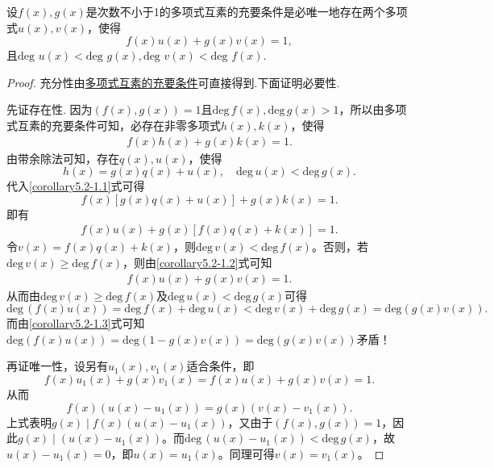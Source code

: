 \documentclass[lang=cn,newtx,10pt,scheme=chinese]{elegantbook}
\begin{document}
\begin{corollary}\label{corollary:次数不小于1的多项式互素的充要条件}
设\(f(x),g(x)\)是次数不小于1的多项式互素的充要条件是必唯一地存在两个多项式\(u(x),v(x)\)，使得
\[
f(x)u(x)+g(x)v(x)=1,
\]
且\(\text{deg }u(x)<\text{deg }g(x),\text{deg }v(x)<\text{deg }f(x)\).
\end{corollary}
\begin{proof}
充分性由\hyperref[theorem:多项式互素的充要条件]{多项式互素的充要条件}可直接得到.下面证明必要性.

先证存在性.
因为\(( f(x),g(x) ) = 1\)且\(\mathrm{deg}\,f(x),\mathrm{deg}\,g(x) > 1\)，所以由多项式互素的充要条件可知，必存在非零多项式\(h(x),k(x)\)，使得
\begin{align}
f(x)h(x)+g(x)k(x)=1. \label{corollary5.2-1.1} 
\end{align}
由带余除法可知，存在\(q(x),u(x)\)，使得
\[
h(x)=g(x)q(x)+u(x),\quad \mathrm{deg}\,u(x)<\mathrm{deg}\,g(x).
\]
代入\eqref{corollary5.2-1.1}式可得
\[
f(x)[g(x)q(x)+u(x)]+g(x)k(x)=1.
\]
即有
\begin{align}
f(x)u(x)+g(x)[f(x)q(x)+k(x)] = 1. \label{corollary5.2-1.2}  
\end{align}
令\(v(x)=f(x)q(x)+k(x)\)，则\(\mathrm{deg}\,v(x)<\mathrm{deg}\,f(x)\)。否则，若\(\mathrm{deg}\,v(x)\geqslant \mathrm{deg}\,f(x)\)，则由\eqref{corollary5.2-1.2}式可知
\begin{align}
f(x)u(x)+g(x)v(x)=1. \label{corollary5.2-1.3}  
\end{align}
从而由\(\mathrm{deg}\,v(x)\geqslant \mathrm{deg}\,f(x)\)及\(\mathrm{deg}\,u(x)<\mathrm{deg}\,g(x)\)可得
\[
\mathrm{deg}\,(f(x)u(x))=\mathrm{deg}\,f(x)+\mathrm{deg}\,u(x)<\mathrm{deg}\,v(x)+\mathrm{deg}\,g(x)=\mathrm{deg}(g(x)v(x)).
\]
而由\eqref{corollary5.2-1.3}式可知\(\mathrm{deg}\left( f\left( x \right) u\left( x \right) \right) =\mathrm{deg}\left( 1-g\left( x \right) v\left( x \right) \right) =\mathrm{deg}\left( g\left( x \right) v\left( x \right) \right) \)矛盾！

再证唯一性，设另有\(u_1(x),v_1(x)\)适合条件，即
\[
f(x)u_1(x)+g(x)v_1(x)=f(x)u(x)+g(x)v(x)=1.
\]
从而
\[
f(x)(u(x)-u_1(x))=g(x)(v(x)-v_1(x)).
\]
上式表明\(g(x)\mid f(x)(u(x)-u_1(x))\)，又由于\(( f(x),g(x) ) = 1\)，因此\(g(x)\mid (u(x)-u_1(x))\)。而\(\mathrm{deg}\,(u(x)-u_1(x))<\mathrm{deg}\,g(x)\)，故\(u(x)-u_1(x)=0\)，即\(u(x)=u_1(x)\)。同理可得\(v(x)=v_1(x)\)。
\end{proof}
\end{document}

